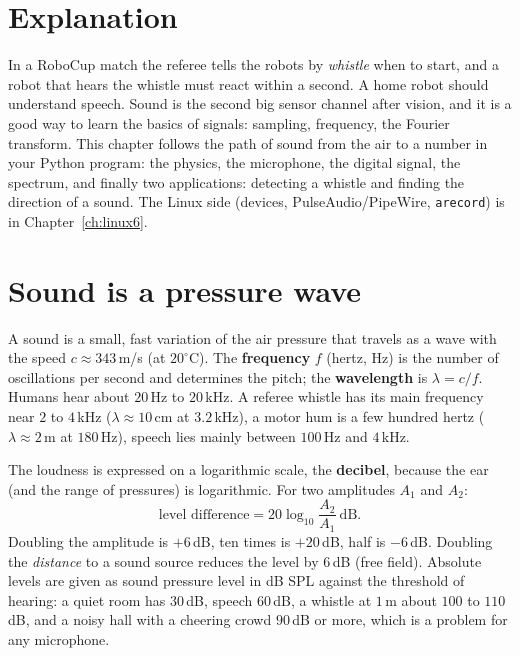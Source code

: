 \label{ch:hw5}

\section*{Explanation}
In a RoboCup match the referee tells the robots by \emph{whistle} when to start, and a robot that hears the whistle must react within a second. A home robot should understand speech. Sound is the second big sensor channel after vision, and it is a good way to learn the basics of signals: sampling, frequency, the Fourier transform. This chapter follows the path of sound from the air to a number in your Python program: the physics, the microphone, the digital signal, the spectrum, and finally two applications: detecting a whistle and finding the direction of a sound. The Linux side (devices, PulseAudio/PipeWire, \texttt{arecord}) is in Chapter~\ref{ch:linux6}.

\section*{Sound is a pressure wave}
A sound is a small, fast variation of the air pressure that travels as a wave with the speed $c\approx343$\,m/s (at $20^\circ$C). The \textbf{frequency} $f$ (hertz, Hz) is the number of oscillations per second and determines the pitch; the \textbf{wavelength} is $\lambda=c/f$. Humans hear about $20$\,Hz to $20$\,kHz. A referee whistle has its main frequency near $2$ to $4$\,kHz ($\lambda\approx10$\,cm at $3.2$\,kHz), a motor hum is a few hundred hertz ($\lambda\approx2$\,m at $180$\,Hz), speech lies mainly between $100$\,Hz and $4$\,kHz.

The loudness is expressed on a logarithmic scale, the \textbf{decibel}, because the ear (and the range of pressures) is logarithmic. For two amplitudes $A_1$ and $A_2$:
\[
\text{level difference}=20\log_{10}\frac{A_2}{A_1}\ \text{dB}.
\]
Doubling the amplitude is $+6$\,dB, ten times is $+20$\,dB, half is $-6$\,dB. Doubling the \emph{distance} to a sound source reduces the level by $6$\,dB (free field). Absolute levels are given as sound pressure level in dB SPL against the threshold of hearing: a quiet room has $30$\,dB, speech $60$\,dB, a whistle at $1$\,m about $100$ to $110$\,dB, and a noisy hall with a cheering crowd $90$\,dB or more, which is a problem for any microphone.

